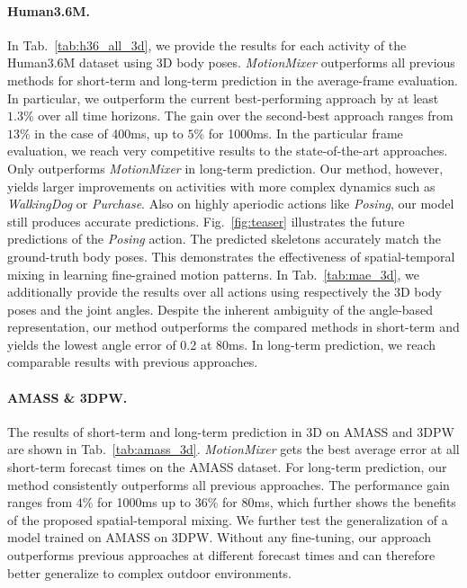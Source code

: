 \documentclass{article}
\begin{document}
\paragraph{Human3.6M.} In Tab.~\ref{tab:h36_all_3d}, we provide the results for each activity of the Human3.6M dataset using 3D body poses. \textit{MotionMixer} outperforms all previous methods for short-term and long-term prediction in the average-frame evaluation. In particular, we outperform the current best-performing approach \cite{zhong2022spatial} by at least $1.3\%$ over all time horizons. The gain over the second-best approach \cite{sofianos2021space} ranges from $13\%$ in the case of 400ms, up to $5\%$ for 1000ms. In the particular frame evaluation, we reach very competitive results to the state-of-the-art approaches. Only \cite{mao2021multi} outperforms \textit{MotionMixer} in long-term prediction. Our method, however, yields larger improvements on activities with more complex dynamics such as \textit{WalkingDog} or \textit{Purchase}. Also on highly aperiodic actions like \textit{Posing}, our model still produces accurate predictions. Fig.~\ref{fig:teaser} illustrates the future predictions of the \textit{Posing} action. The predicted skeletons accurately match the ground-truth body poses. This demonstrates the effectiveness of  spatial-temporal mixing in learning fine-grained motion patterns.  In Tab.~\ref{tab:mae_3d}, we additionally provide the results over all actions using respectively the 3D body poses and the joint angles. Despite the inherent ambiguity of the angle-based representation, our method outperforms the compared methods in short-term and yields the lowest angle error of 0.2 at 80ms. In long-term prediction, we reach comparable results with previous approaches. 


\paragraph{AMASS \& 3DPW.} The results of short-term and long-term prediction in 3D on AMASS and 3DPW are shown in Tab.~\ref{tab:amass_3d}. \textit{MotionMixer} gets the best average error at all short-term forecast times on the AMASS dataset. For long-term prediction, our method consistently outperforms all previous approaches. The performance gain ranges from $4\%$ for 1000ms up to $36\%$ for 80ms, which further shows the benefits of the proposed spatial-temporal mixing. We further test the generalization of a model trained on AMASS on 3DPW. Without any fine-tuning, our approach outperforms previous approaches at different forecast times and can therefore better generalize to complex outdoor environments.
\end{document}
